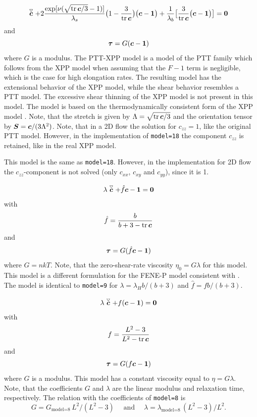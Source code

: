 \medskip
\[
  \stackrel{\scriptscriptstyle\bigtriangledown}{\boldsymbol{c}}
 +2\frac{\exp[\nu(\sqrt{\operatorname{tr}\boldsymbol{c}/3}-1)]}{\lambda_s}
     \big(1-\frac3{\operatorname{tr}\boldsymbol{c}}\big)\big(\boldsymbol{c} - \boldsymbol{1}\big)
   +\frac1{\lambda_b}\big[\frac{3}{\operatorname{tr}\boldsymbol{c}}\big(\boldsymbol{c} -\boldsymbol{1}\big)\big]=\boldsymbol{0}
\]
and
\[
     \boldsymbol{\tau}=G(\boldsymbol{c} - \boldsymbol{1})
\]
where $G$ is a modulus. The PTT-XPP model \cite{tanner2003simple} is a model of the PTT family
which follows from the XPP model when assuming that the $F-1$ term is
negligible, which is the case for high elongation rates. The resulting
model has the extensional behavior of the XPP model, while the shear
behavior resembles a PTT model. The excessive shear thinning of the XPP
model is not present in this model. The model is based on the thermodynamically consistent form of the XPP model \cite{verbeeten2004numerical}.
Note, that the stretch is given by $\Lambda=\sqrt{\operatorname{tr}\boldsymbol{c}/3}$ and the
orientation tensor by $\boldsymbol{S}=\boldsymbol{c}/(3\Lambda^2)$. Note, that in a 2D flow the solution for $c_{zz}=1$, like the original PTT model. However, in the implementation of \texttt{model=18} the component $c_{zz}$ is retained, like in the real XPP model. 

This model is the same as \texttt{model=18}. However, in the implementation for 2D flow the $c_{zz}$-component is not solved (only $c_{xx}$, $c_{xy}$ and $c_{yy}$), since it is 1.

\[
 \lambda\stackrel{\scriptscriptstyle\bigtriangledown}{\boldsymbol{c}}+\hat f\boldsymbol{c}-\boldsymbol{1}=\boldsymbol{0}
\]
with
\[
      \hat f=\frac{b}{b+3-\operatorname{tr}\boldsymbol{c}}
\]
and
\[
     \boldsymbol{\tau}=G(\hat f\boldsymbol{c} - \boldsymbol{1})
\]
where $G=nkT$. Note, that the zero-shear-rate viscosity $\eta_0=G\lambda$ for this model. This model is a different formulation for the FENE-P model consistent with \cite{wapperom_thermodynamics_1998,hutter_fluctuating_2018}. The model is identical to \texttt{model=9} for
$\lambda=\lambda_Hb/(b+3)$ and $\hat f=fb/(b+3)$.

\[
 \lambda\stackrel{\scriptscriptstyle\bigtriangledown}{\boldsymbol{c}}+f({\boldsymbol{c}}-\boldsymbol{1})=\boldsymbol{0}
\]
with
\[
      f=\frac{L^2-3}{L^2-\operatorname{tr}{\boldsymbol{c}}}
\]
and
\[
     \boldsymbol{\tau}=G(f\boldsymbol{c} - \boldsymbol{1})
\]
where $G$ is a modulus. This model has a constant viscosity equal to
$\eta=G\lambda$. Note, that the coefficients $G$ and $\lambda$ are the linear modulus and  relaxation time, respectively. The relation with the coefficients of \texttt{model=8} is 
\[G=G_\text{model=8}\,L^2/(L^2-3) \quad\text{ and } \quad
\lambda=\lambda_\text{model=8}\,(L^2-3)/L^2.\]

